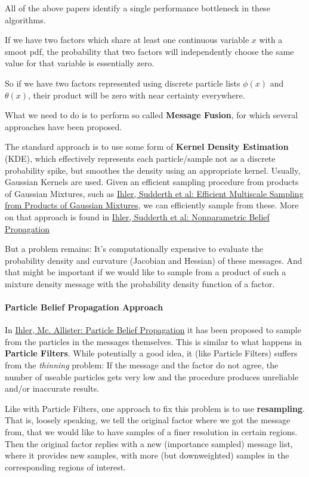 \documentclass[letterpaper,10pt,english]{/home/londenberg/python-env/clean/lib/python2.7/site-packages/sphinx/texinputs/sphinxhowto}
\begin{document}
All of the above papers identify a single performance bottleneck in
these algorithms.

If we have two factors which share at least one continuous variable $x$
with a smoot pdf, the probability that two factors will independently
choose the same value for that variable is essentially zero.

So if we have two factors represented using discrete particle lists
$\phi(x)$ and $\theta(x)$, their product will be zero with near
certainty everywhere.

What we need to do is to perform so called \textbf{Message Fusion}, for
which several approaches have been proposed.

The standard approach is to use some form of \textbf{Kernel Density
Estimation} (KDE), which effectively represents each particle/sample not
as a discrete probability spike, but smoothes the density using an
appropriate kernel. Usually, Gaussian Kernels are used. Given an
efficient sampling procedure from products of Gaussian Mixtures, such as
\href{http://ssg.mit.edu/nbp/papers/nips03.pdf}{Ihler, Sudderth et al:
Efficient Multiscale Sampling from Products of Gaussian Mixtures}, we
can efficiently sample from these. More on that approach is found in
\href{http://ssg.mit.edu/nbp/papers/nips03.pdf}{Ihler, Sudderth et al:
Nonparametric Belief Propagation}

But a problem remains: It's computationally expensive to evaluate the
probability density and curvature (Jacobian and Hessian) of these
messages. And that might be important if we would like to sample from a
product of such a mixture density message with the probability density
function of a factor.\paragraph{Particle Belief Propagation Approach}

In
\href{http://machinelearning.wustl.edu/mlpapers/paper\_files/AISTATS09\_IhlerM.pdf}{Ihler,
Mc. Allister: Particle Belief Propagation} it has been proposed to
sample from the particles in the messages themselves. This is similar to
what happens in \textbf{Particle Filters}. While potentially a good
idea, it (like Particle Filters) suffers from the \emph{thinning}
problem: If the message and the factor do not agree, the number of
useable particles gets very low and the procedure produces unreliable
and/or inaccurate results.

Like with Particle Filters, one approach to fix this problem is to use
\textbf{resampling}. That is, loosely speaking, we tell the original
factor where we got the message from, that we would like to have samples
of a finer resolution in certain regions. Then the original factor
replies with a new (importance sampled) message list, where it provides
new samples, with more (but downweighted) samples in the corresponding
regions of interest.
\end{document}
